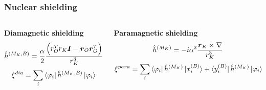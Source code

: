 \begin{frame}
\frametitle{Nuclear shielding}
\begin{columns}

\begin{column}[b]{0.5\textwidth}
\centering
\textbf{Diamagnetic shielding}
\begin{equation}
    \nonumber
    \hat{h}^{(M_K,B)} =
    \frac{\alpha}{2}\frac{\Big(r_O^Tr_K\boldsymbol{I} - 
    \boldsymbol{r}_O\boldsymbol{r}_O^T\Big)}{r_K^3}
\end{equation}
\vspace{2mm}
\begin{equation}
    \nonumber
    \xi^{dia} = \sum_i \bra{\varphi_i} \hat{h}^{(M_K,B)} \ket{\varphi_i}
\end{equation}
\end{column}

\begin{column}[b]{0.5\textwidth}
\centering
\textbf{Paramagnetic shielding}
\begin{equation}
    \nonumber
    \hat{h}^{(M_K)} = -i \alpha^2 \frac{\boldsymbol{r}_K\times\nabla}{r_K^3}
\end{equation}
\vspace{2mm}
\begin{equation}
    \nonumber
    \xi^{para} = \sum_i 
    \bra{\varphi_i}\hat{h}^{(M_K)} \ket{x_i^{(B)}} + 
    \bra{y_i^{(B)}}\hat{h}^{(M_K)}\ket{\varphi_i}
\end{equation}
\end{column}

\end{columns}
\vspace{5mm}


\end{frame}
